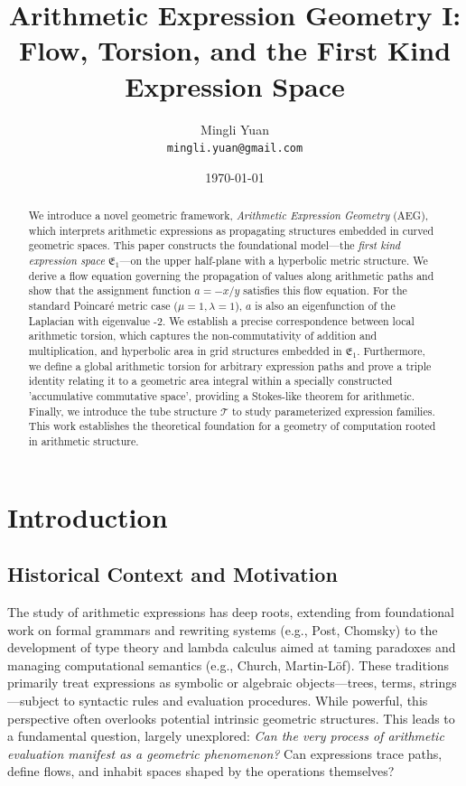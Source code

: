 \documentclass[12pt]{article}
\title{Arithmetic Expression Geometry I: Flow, Torsion, and the First Kind Expression Space}
\author{Mingli Yuan \\ %
        \texttt{mingli.yuan@gmail.com}} %
\date{\today} %
\begin{document}
\maketitle

\begin{abstract}
We introduce a novel geometric framework, \emph{Arithmetic Expression Geometry} (AEG), which interprets arithmetic expressions as propagating structures embedded in curved geometric spaces. This paper constructs the foundational model---the \emph{first kind expression space} \( \mathfrak{E}_1 \)---on the upper half-plane with a hyperbolic metric structure. We derive a flow equation governing the propagation of values along arithmetic paths and show that the assignment function \( a = -x/y \) satisfies this flow equation. For the standard Poincaré metric case (\(\mu=1, \lambda=1\)), \(a\) is also an eigenfunction of the Laplacian with eigenvalue -2. We establish a precise correspondence between local arithmetic torsion, which captures the non-commutativity of addition and multiplication, and hyperbolic area in grid structures embedded in \( \mathfrak{E}_1 \). Furthermore, we define a global arithmetic torsion for arbitrary expression paths and prove a triple identity relating it to a geometric area integral within a specially constructed 'accumulative commutative space', providing a Stokes-like theorem for arithmetic. Finally, we introduce the tube structure \( \mathcal{T} \) to study parameterized expression families. This work establishes the theoretical foundation for a geometry of computation rooted in arithmetic structure.
\end{abstract}

\tableofcontents
\newpage

\section{Introduction}

\subsection{Historical Context and Motivation}
The study of arithmetic expressions has deep roots, extending from foundational work on formal grammars and rewriting systems (e.g., Post\cite{Post1943FormalRO}, Chomsky\cite{Chomsky1956ThreeMF}) to the development of type theory and lambda calculus aimed at taming paradoxes and managing computational semantics (e.g., Church\cite{Church1940AFO}, Martin-L\"{o}f\cite{MartinLf1975AnIT}). These traditions primarily treat expressions as symbolic or algebraic objects—trees, terms, strings—subject to syntactic rules and evaluation procedures. While powerful, this perspective often overlooks potential intrinsic geometric structures. This leads to a fundamental question, largely unexplored: \textit{Can the very process of arithmetic evaluation manifest as a geometric phenomenon?} Can expressions trace paths, define flows, and inhabit spaces shaped by the operations themselves?
\end{document}
